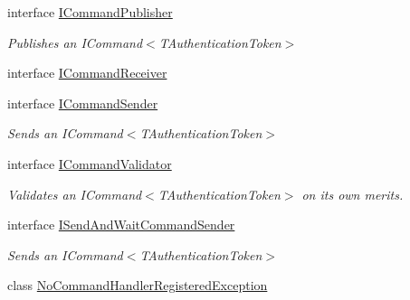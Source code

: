 \begin{DoxyCompactItemize}
interface \hyperlink{interfaceCqrs_1_1Commands_1_1ICommandPublisher}{I\+Command\+Publisher}
\begin{DoxyCompactList}\small\item\em Publishes an I\+Command$<$\+T\+Authentication\+Token$>$ \end{DoxyCompactList}\item 
interface \hyperlink{interfaceCqrs_1_1Commands_1_1ICommandReceiver}{I\+Command\+Receiver}
\item 
interface \hyperlink{interfaceCqrs_1_1Commands_1_1ICommandSender}{I\+Command\+Sender}
\begin{DoxyCompactList}\small\item\em Sends an I\+Command$<$\+T\+Authentication\+Token$>$ \end{DoxyCompactList}\item 
interface \hyperlink{interfaceCqrs_1_1Commands_1_1ICommandValidator}{I\+Command\+Validator}
\begin{DoxyCompactList}\small\item\em Validates an I\+Command$<$\+T\+Authentication\+Token$>$ on its own merits. \end{DoxyCompactList}\item 
interface \hyperlink{interfaceCqrs_1_1Commands_1_1ISendAndWaitCommandSender}{I\+Send\+And\+Wait\+Command\+Sender}
\begin{DoxyCompactList}\small\item\em Sends an I\+Command$<$\+T\+Authentication\+Token$>$ \end{DoxyCompactList}\item 
class \hyperlink{classCqrs_1_1Commands_1_1NoCommandHandlerRegisteredException}{No\+Command\+Handler\+Registered\+Exception}
\end{DoxyCompactItemize}
